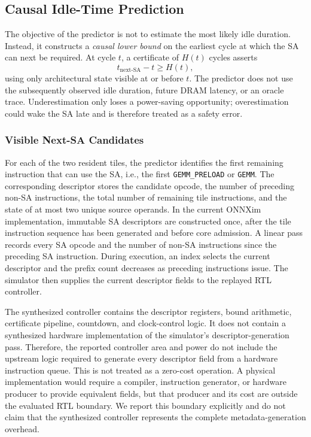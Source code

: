 \subsection{Causal Idle-Time Prediction}
\label{sec:causal-predictor}

The objective of the predictor is not to estimate the most likely idle
duration. Instead, it constructs a \emph{causal lower bound} on the earliest
cycle at which the SA can next be required. At cycle $t$, a certificate of
$H(t)$ cycles asserts
\begin{equation}
  t_{\mathrm{next\mbox{-}SA}} - t \geq H(t),
  \label{eq:causal-certificate}
\end{equation}
using only architectural state visible at or before $t$. The predictor does
not use the subsequently observed idle duration, future DRAM latency, or an
oracle trace. Underestimation only loses a power-saving opportunity;
overestimation could wake the SA late and is therefore treated as a safety
error.

\subsubsection{Visible Next-SA Candidates}

For each of the two resident tiles, the predictor identifies the first
remaining instruction that can use the SA, i.e., the first
\texttt{GEMM\_PRELOAD} or \texttt{GEMM}. The corresponding descriptor stores
the candidate opcode, the number of preceding non-SA instructions, the total
number of remaining tile instructions, and the state of at most two unique
source operands. In the current ONNXim implementation, immutable SA
descriptors are constructed once, after the tile instruction sequence has
been generated and before core admission. A linear pass records every SA
opcode and the number of non-SA instructions since the preceding SA
instruction. During execution, an index selects the current descriptor and
the prefix count decreases as preceding instructions issue. The simulator
then supplies the current descriptor fields to the replayed RTL controller.

The synthesized controller contains the descriptor registers, bound
arithmetic, certificate pipeline, countdown, and clock-control logic. It does
not contain a synthesized hardware implementation of the simulator's
descriptor-generation pass. Therefore, the reported controller area and power do
not include the upstream logic required to generate every descriptor field
from a hardware instruction queue. This is not treated as a zero-cost
operation. A physical implementation would require a compiler, instruction
generator, or hardware producer to provide equivalent fields, but that
producer and its cost are outside the evaluated RTL boundary. We report this
boundary explicitly and do not claim that the synthesized controller
represents the complete metadata-generation overhead.

